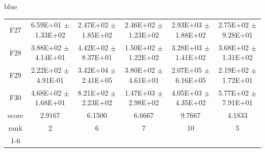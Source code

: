 \documentclass[journal, onecolumn]{IEEEtran}
\begin{document}
\begin{color}{blue}
\begin{table}[htbp!]
\begin{tabular}{c|ccccc}
			F27	 &	6.59E+01	$\pm$	1.33E+02		 &	2.47E+02	$\pm$	1.85E+02		 &	2.46E+02	$\pm$	1.23E+02		 &	2.93E+03	$\pm$	1.88E+02		 &	2.75E+02	$\pm$	9.28E+01	\\	
			F28	 &	3.88E+02	$\pm$	4.14E+01		 &	4.42E+02	$\pm$	8.37E+01		 &	1.50E+02	$\pm$	1.22E+02		 &	3.28E+03	$\pm$	1.41E+02		 &	3.68E+02	$\pm$	1.31E+02	\\	
			F29	 &	2.22E+02	$\pm$	4.91E-01		 &	3.42E+04	$\pm$	2.41E+05		 &	3.80E+02	$\pm$	4.61E+01		 &	2.07E+05	$\pm$	6.16E+05		 &	2.19E+02	$\pm$	1.72E+01	\\	
			F30	 &	4.68E+02	$\pm$	1.68E+01		 &	8.21E+02	$\pm$	2.23E+02		 &	1.47E+03	$\pm$	2.98E+02		 &	4.05E+03	$\pm$	4.35E+02		 &	5.77E+02	$\pm$	7.91E+01	\\	\hline
			score	 	& 2.9167 & 6.1500 & 6.6667 & 9.7667 & 4.1833											\\													
			rank 		& 2 & 6 & 7 & 10 & 5											\\	\cline{1-6}												
			
		\end{tabular}
	\end{table}
	

\end{color}
\end{document}
